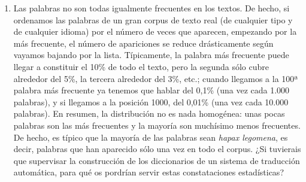 \begin{enumerate}
\item Las palabras no son todas igualmente frecuentes en los textos. De hecho, si ordenamos las palabras de un gran corpus de texto real (de cualquier tipo y de cualquier idioma) por el número de veces que aparecen, empezando por la más frecuente, el número de apariciones se reduce drásticamente según vayamos bajando por la lista. Típicamente, la palabra más frecuente puede llegar a constituir el 10\% de todo el texto, pero la segunda sólo cubre alrededor del 5\%, la tercera alrededor del 3\%, etc.; cuando llegamos a la 100ª palabra más frecuente ya tenemos que hablar del 0,1\% (una vez cada 1.000 palabras), y si llegamos a la posición 1000, del 0,01\% (una vez cada 10.000 palabras). En resumen, la distribución no es nada homogénea: unas pocas palabras son las más frecuentes y la mayoría son muchísimo menos frecuentes. De hecho, es típico que la mayoría de las palabras sean \emph{hapax legomena}, es decir, palabras que han aparecido sólo una vez en todo el corpus. ¿Si tuvierais que supervisar la construcción de los diccionarios de un sistema de traducción automática, para qué os pordrían servir estas constataciones estadísticas? 


\end{enumerate}
